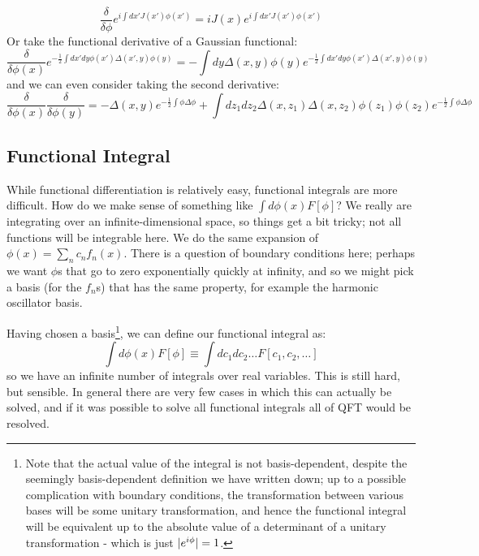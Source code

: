 \begin{equation}
    \frac{\delta}{\delta \phi}e^{i \int dx' J(x'
    )\phi(x')} = iJ(x)e^{i \int dx' J(x')\phi(x')}
\end{equation}
Or take the functional derivative of a Gaussian functional:
\begin{equation}
    \frac{\delta}{\delta \phi(x)}e^{-\frac{1}{2}\int dx'dy\phi(x')\Delta(x', y)\phi(y)} = -\int dy \Delta (x, y)\phi(y)e^{-\frac{1}{2}\int dx'dy\phi(x')\Delta(x', y)\phi(y)} 
\end{equation}
and we can even consider taking the second derivative:
\begin{equation}
   \frac{\delta}{\delta \phi(x)}\frac{\delta}{\delta \phi(y)} = -\Delta(x, y)e^{-\frac{1}{2}\int \phi \Delta \phi} + \int dz_1dz_2\Delta(x, z_1)\Delta(x, z_2)\phi(z_1)\phi(z_2)e^{-\frac{1}{2}\int \phi \Delta \phi} 
\end{equation}

\subsection{Functional Integral}
While functional differentiation is relatively easy, functional integrals are more difficult. How do we make sense of something like $\int d\phi(x) F[\phi]$? We really are integrating over an infinite-dimensional space, so things get a bit tricky; not all functions will be integrable here. We do the same expansion of $\phi(x) = \sum_n c_n f_n(x)$. There is a question of boundary conditions here; perhaps we want $\phi$s that go to zero exponentially quickly at infinity, and so we might pick a basis (for the $f_n$s) that has the same property, for example the harmonic oscillator basis.

Having chosen a basis\footnote{Note that the actual value of the integral is not basis-dependent, despite the seemingly basis-dependent definition we have written down; up to a possible complication with boundary conditions, the transformation between various bases will be some unitary transformation, and hence the functional integral will be equivalent up to the absolute value of a determinant of a unitary transformation - which is just $\abs{e^{i\phi}} = 1$.}, we can define our functional integral as:
\begin{equation}
    \int d\phi(x) F[\phi] \equiv \int dc_1 dc_2 \ldots F[c_1, c_2, \ldots]
\end{equation}
so we have an infinite number of integrals over real variables. This is still hard, but sensible. In general there are very few cases in which this can actually be solved, and if it was possible to solve all functional integrals all of QFT would be resolved.

